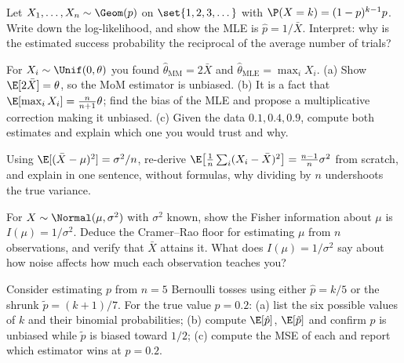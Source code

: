 \begin{exercise}
\label{ch30:exc-geom}
Let $X_1,\dots,X_n \sim \Geom(p)$ on $\set{1,2,3,\dots}$ with
$\P(X=k)=(1-p)^{k-1}p$. Write down the log-likelihood, and show the MLE is
$\hat p = 1/\bar X$. Interpret: why is the estimated success probability the
reciprocal of the average number of trials?
\end{exercise}

\begin{exercise}
\label{ch30:exc-unif}
For $X_i\sim\Unif(0,\theta)$ you found $\hat\theta_{\mathrm{MM}}=2\bar X$ and
$\hat\theta_{\mathrm{MLE}}=\max_i X_i$.
(a) Show $\E[2\bar X]=\theta$, so the MoM estimator is unbiased.
(b) It is a fact that $\E[\max_i X_i]=\frac{n}{n+1}\theta$; find the bias of the
MLE and propose a multiplicative correction making it unbiased.
(c) Given the data $0.1, 0.4, 0.9$, compute both estimates and explain which one
you would trust and why.
\end{exercise}

\begin{exercise}
\label{ch30:exc-n-minus-1}
Using $\E[(\bar X-\mu)^2]=\sigma^2/n$, re-derive
$\E\big[\frac1n\sum_i(X_i-\bar X)^2\big]=\frac{n-1}{n}\sigma^2$ from scratch, and
explain in one sentence, without formulas, why dividing by $n$ undershoots the
true variance.
\end{exercise}

\begin{exercise}
\label{ch30:exc-fisher-normal}
For $X\sim\Normal(\mu,\sigma^2)$ with $\sigma^2$ known, show the Fisher
information about $\mu$ is $I(\mu)=1/\sigma^2$. Deduce the Cramer--Rao floor for
estimating $\mu$ from $n$ observations, and verify that $\bar X$ attains it.
What does $I(\mu)=1/\sigma^2$ say about how noise affects how much each
observation teaches you?
\end{exercise}

\begin{exercise}
\label{ch30:exc-bv}
Consider estimating $p$ from $n=5$ Bernoulli tosses using either
$\hat p = k/5$ or the shrunk $\tilde p=(k+1)/7$. For the true value $p=0.2$:
(a) list the six possible values of $k$ and their binomial probabilities;
(b) compute $\E[\hat p]$, $\E[\tilde p]$ and confirm $\hat p$ is unbiased while
$\tilde p$ is biased toward $1/2$;
(c) compute the MSE of each and report which estimator wins at $p=0.2$.
\end{exercise}

